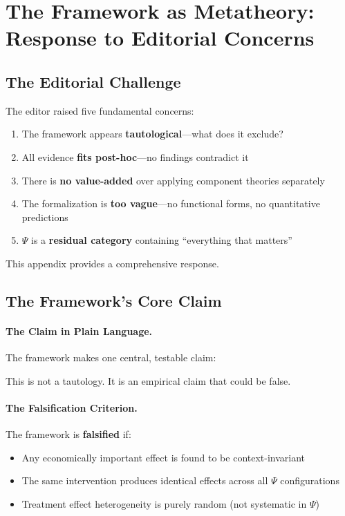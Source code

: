 \documentclass[12pt,a4paper]{article}
\begin{document}
\section{The Framework as Metatheory: Response to Editorial Concerns}
\label{app:metatheory}

\subsection{The Editorial Challenge}

The editor raised five fundamental concerns:
\begin{enumerate}
    \item The framework appears \textbf{tautological}---what does it exclude?
    \item All evidence \textbf{fits post-hoc}---no findings contradict it
    \item There is \textbf{no value-added} over applying component theories separately
    \item The formalization is \textbf{too vague}---no functional forms, no quantitative predictions
    \item $\Psi$ is a \textbf{residual category} containing ``everything that matters''
\end{enumerate}

This appendix provides a comprehensive response.

\subsection{The Framework's Core Claim}

\paragraph{The Claim in Plain Language.}
The framework makes one central, testable claim:

\begin{center}
\end{center}

This is not a tautology. It is an empirical claim that could be false.

\paragraph{The Falsification Criterion.}
The framework is \textbf{falsified} if:
\begin{itemize}
    \item Any economically important effect is found to be context-invariant
    \item The same intervention produces identical effects across all $\Psi$ configurations
    \item Treatment effect heterogeneity is purely random (not systematic in $\Psi$)
\end{itemize}
\end{document}
